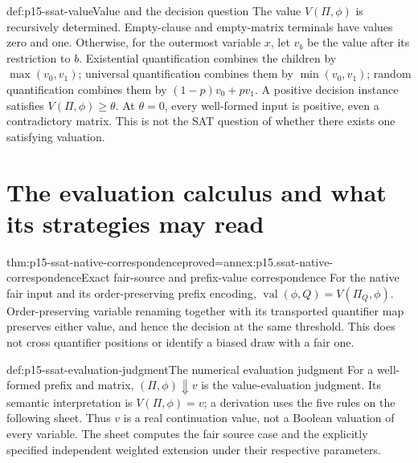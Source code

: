 \begin{hbdefinition}{def:p15-ssat-value}{Value and the decision question}
The value \(V(\Pi,\phi)\) is recursively determined. Empty-clause
and empty-matrix terminals have values zero and one. Otherwise, for
the outermost variable \(x\), let \(v_b\) be the value after its
restriction to \(b\). Existential quantification combines the children
by \(\max(v_0,v_1)\); universal quantification combines them by
\(\min(v_0,v_1)\); random quantification combines them by
\((1-p)v_0+pv_1\). A positive decision instance satisfies
\(V(\Pi,\phi)\geq\theta\). At \(\theta=0\), every well-formed
input is positive, even a contradictory matrix. This is not the SAT
question of whether there exists one satisfying valuation.
\end{hbdefinition}

\section{The evaluation calculus and what its strategies may read}
\label{sec:p15-ssat-evaluation}

\begin{hblemma}{thm:p15-ssat-native-correspondence}{proved=annex:p15.ssat-native-correspondence}{Exact fair-source and prefix-value correspondence}
For the native fair input and its order-preserving prefix encoding,
\(\operatorname{val}(\phi,Q)=V(\Pi_Q,\phi)\).
Order-preserving variable renaming together with its transported
quantifier map preserves either value, and hence the decision at the same
threshold. This does not cross quantifier positions or identify a biased
draw with a fair one.
\end{hblemma}

\begin{hbdefinition}{def:p15-ssat-evaluation-judgment}{The numerical evaluation judgment}
For a well-formed prefix and matrix, \((\Pi,\phi)\Downarrow v\)
is the value-evaluation judgment. Its semantic interpretation is
\(V(\Pi,\phi)=v\); a derivation uses the five rules on the following
sheet. Thus \(v\) is a real continuation value, not a Boolean valuation
of every variable. The sheet computes the fair source case and the explicitly
specified independent weighted extension under their respective parameters.
\end{hbdefinition}



